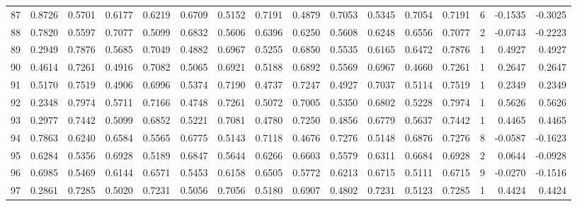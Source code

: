 \begin{tabular}{lrrrrrrrrrrrrrrr}
87  &      0.8726 &  0.5701 &  0.6177 &  0.6219 &  0.6709 &  0.5152 &  0.7191 &  0.4879 &  0.7053 &  0.5345 &   0.7054 &     0.7191 &      6 &                   -0.1535 &                    -0.3025 \\
88  &      0.7820 &  0.5597 &  0.7077 &  0.5099 &  0.6832 &  0.5606 &  0.6396 &  0.6250 &  0.5608 &  0.6248 &   0.6556 &     0.7077 &      2 &                   -0.0743 &                    -0.2223 \\
89  &      0.2949 &  0.7876 &  0.5685 &  0.7049 &  0.4882 &  0.6967 &  0.5255 &  0.6850 &  0.5535 &  0.6165 &   0.6472 &     0.7876 &      1 &                    0.4927 &                     0.4927 \\
90  &      0.4614 &  0.7261 &  0.4916 &  0.7082 &  0.5065 &  0.6921 &  0.5188 &  0.6892 &  0.5569 &  0.6967 &   0.4660 &     0.7261 &      1 &                    0.2647 &                     0.2647 \\
91  &      0.5170 &  0.7519 &  0.4906 &  0.6996 &  0.5374 &  0.7190 &  0.4737 &  0.7247 &  0.4927 &  0.7037 &   0.5114 &     0.7519 &      1 &                    0.2349 &                     0.2349 \\
92  &      0.2348 &  0.7974 &  0.5711 &  0.7166 &  0.4748 &  0.7261 &  0.5072 &  0.7005 &  0.5350 &  0.6802 &   0.5228 &     0.7974 &      1 &                    0.5626 &                     0.5626 \\
93  &      0.2977 &  0.7442 &  0.5099 &  0.6852 &  0.5221 &  0.7081 &  0.4780 &  0.7250 &  0.4856 &  0.6779 &   0.5637 &     0.7442 &      1 &                    0.4465 &                     0.4465 \\
94  &      0.7863 &  0.6240 &  0.6584 &  0.5565 &  0.6775 &  0.5143 &  0.7118 &  0.4676 &  0.7276 &  0.5148 &   0.6876 &     0.7276 &      8 &                   -0.0587 &                    -0.1623 \\
95  &      0.6284 &  0.5356 &  0.6928 &  0.5189 &  0.6847 &  0.5644 &  0.6266 &  0.6603 &  0.5579 &  0.6311 &   0.6684 &     0.6928 &      2 &                    0.0644 &                    -0.0928 \\
96  &      0.6985 &  0.5469 &  0.6144 &  0.6571 &  0.5453 &  0.6158 &  0.6505 &  0.5772 &  0.6213 &  0.6715 &   0.5111 &     0.6715 &      9 &                   -0.0270 &                    -0.1516 \\
97  &      0.2861 &  0.7285 &  0.5020 &  0.7231 &  0.5056 &  0.7056 &  0.5180 &  0.6907 &  0.4802 &  0.7231 &   0.5123 &     0.7285 &      1 &                    0.4424 &                     0.4424 \\

\end{tabular}

